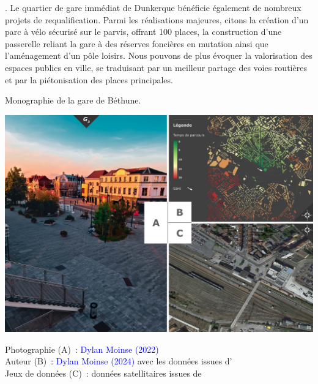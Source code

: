 \begin{refsegment}
{} \textcolor{blue}{\autocites[25]{javary_gratuite_2020}[10]{kilani_multimodal_2022}}. Le quartier de gare immédiat de Dunkerque bénéficie également de nombreux projets de requalification. Parmi les réalisations majeures, citons la création d'un parc à vélo sécurisé sur le parvis, offrant 100 places, la construction d'une passerelle reliant la gare à des réserves foncières en mutation ainsi que l'aménagement d'un pôle loisirs. Nous pouvons de plus évoquer la valorisation des espaces publics en ville, se traduisant par un meilleur partage des voies routières et par la piétonisation des places principales.%

        \begin{carte}[h!]\vspace*{4pt}
        \caption{Monographie de la gare de Béthune.}
        \label{fig-chap3:monographie-bethune}
        \centerline{\includegraphics[height=.35\pageheight]{src/Figures/Chap-3/FR_Gare_Bethune.jpg}}
        \vspace{5pt}
        \begin{flushright}\scriptsize{
        Photographie (A)~: \textcolor{blue}{Dylan Moinse (2022)}
        \\
        Auteur (B)~: \textcolor{blue}{Dylan Moinse (2024)} avec les données issues d'\textcolor{blue}{\textcite{openstreetmap_openstreetmap_2023}}
        \\
      Jeux de données (C)~: données satellitaires issues de \textcolor{blue}{\textcite{google_earth_google_2023}}
      }\end{flushright}
      \end{carte}


\end{refsegment}
